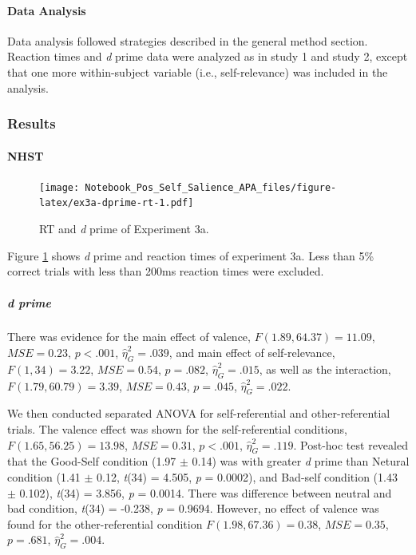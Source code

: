 \documentclass[
  english,
  man]{apa6}
\let\oldparagraph\paragraph
\renewcommand{\paragraph}[1]{\oldparagraph{#1}\mbox{}}
\let\oldsubparagraph\subparagraph
\renewcommand{\subparagraph}[1]{\oldsubparagraph{#1}\mbox{}}
\begin{document}
\hypertarget{data-analysis-6}{%
\paragraph{Data Analysis}\label{data-analysis-6}}

Data analysis followed strategies described in the general method section. Reaction times and \emph{d} prime data were analyzed as in study 1 and study 2, except that one more within-subject variable (i.e., self-relevance) was included in the analysis.

\hypertarget{results-5}{%
\subsubsection{Results}\label{results-5}}

\hypertarget{nhst-3}{%
\paragraph{NHST}\label{nhst-3}}

\begin{figure}
\centering
\texttt{[image: Notebook\_Pos\_Self\_Salience\_APA\_files/figure-latex/ex3a-dprime-rt-1.pdf]}
\caption{\label{fig:ex3a-dprime-rt}RT and \emph{d} prime of Experiment 3a.}
\end{figure}

Figure \ref{fig:ex3a-dprime-rt} shows \emph{d} prime and reaction times of experiment 3a. Less than 5\% correct trials with less than 200ms reaction times were excluded.

\hypertarget{d-prime-3}{%
\subparagraph{d prime}\label{d-prime-3}}

There was evidence for the main effect of valence, \(F(1.89, 64.37) = 11.09\), \(\mathit{MSE} = 0.23\), \(p < .001\), \(\hat{\eta}^2_G = .039\), and main effect of self-relevance, \(F(1, 34) = 3.22\), \(\mathit{MSE} = 0.54\), \(p = .082\), \(\hat{\eta}^2_G = .015\), as well as the interaction, \(F(1.79, 60.79) = 3.39\), \(\mathit{MSE} = 0.43\), \(p = .045\), \(\hat{\eta}^2_G = .022\).

We then conducted separated ANOVA for self-referential and other-referential trials. The valence effect was shown for the self-referential conditions, \(F(1.65, 56.25) = 13.98\), \(\mathit{MSE} = 0.31\), \(p < .001\), \(\hat{\eta}^2_G = .119\). Post-hoc test revealed that the Good-Self condition (1.97 \(\pm\) 0.14) was with greater \emph{d} prime than Netural condition (1.41 \(\pm\) 0.12, \emph{t}(34) = 4.505, \emph{p} = 0.0002), and Bad-self condition (1.43 \(\pm\) 0.102), \emph{t}(34) = 3.856, \emph{p} = 0.0014. There was difference between neutral and bad condition, \emph{t}(34) = -0.238, \emph{p} = 0.9694. However, no effect of valence was found for the other-referential condition \(F(1.98, 67.36) = 0.38\), \(\mathit{MSE} = 0.35\), \(p = .681\), \(\hat{\eta}^2_G = .004\).
\end{document}
